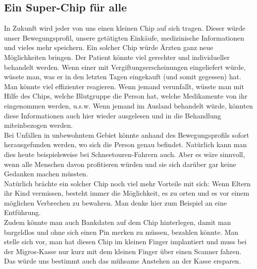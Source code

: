 \subsection{Ein Super-Chip für alle}
In Zukunft wird jeder von uns einen kleinen Chip auf 
sich tragen. Dieser würde unser Bewegungsprofil, unsere getätigten 
Einkäufe, medizinische Informationen und vieles mehr speichern. Ein 
solcher Chip würde Ärzten ganz neue Möglichkeiten bringen. 
Der Patient k\"onnte viel gerechter und individueller behandelt werden. Wenn 
einer mit Vergiftungserscheinungen eingeliefert würde, wüsste man, was 
er in den letzten Tagen eingekauft (und somit gegessen) hat. Man 
könnte viel effizienter reagieren. Wenn jemand verunfallt, wüsste man 
mit Hilfe des Chips, welche Blutgruppe die Person hat, welche 
Medikamente von ihr eingenommen werden, u.s.w. Wenn jemand im Ausland 
behandelt würde, könnten diese Informationen auch hier wieder 
ausgelesen und in die Behandlung miteinbezogen werden.\\
Bei Unfällen in unbewohntem Gebiet könnte anhand des Bewegungsprofils 
sofort herausgefunden werden, wo sich die Person genau befindet. 
Natürlich kann man dies heute beispielsweise bei Schneetouren-Fahrern 
auch. Aber es wäre sinnvoll, wenn alle Menschen davon profitieren 
würden und sie sich darüber gar keine Gedanken machen müssten.\\
Natürlich brächte ein solcher Chip noch viel mehr Vorteile mit sich: 
Wenn Eltern ihr Kind vermissen, besteht immer die Möglichkeit, es zu 
orten und es vor einem möglichen Verbrechen zu bewahren. Man denke hier 
zum Beispiel an eine Entführung. \\
Zudem könnte man auch Bankdaten auf dem Chip hinterlegen, damit man 
bargeldlos und ohne sich einen Pin merken zu müssen, bezahlen könnte. 
Man stelle sich vor, man hat diesen Chip im kleinen Finger implantiert 
und muss bei der Migros-Kasse nur kurz mit dem kleinen Finger über 
einen Scanner fahren. Das würde uns bestimmt auch das mühsame Anstehen 
an der Kasse ersparen.

